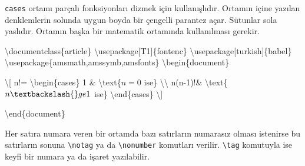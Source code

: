\documentclass[
  letterpaper,
  DIV=11,
  numbers=noendperiod]{scrreprt}
\newenvironment{Shaded}{\begin{snugshade}}{\end{snugshade}}
\newcommand{\BuiltInTok}[1]{\textcolor[rgb]{0.00,0.23,0.31}{#1}}
\newcommand{\ExtensionTok}[1]{\textcolor[rgb]{0.00,0.23,0.31}{#1}}
\newcommand{\KeywordTok}[1]{\textcolor[rgb]{0.00,0.23,0.31}{#1}}
\newcommand{\NormalTok}[1]{\textcolor[rgb]{0.00,0.23,0.31}{#1}}
\newcommand{\SpecialCharTok}[1]{\textcolor[rgb]{0.37,0.37,0.37}{#1}}
\newcommand{\SpecialStringTok}[1]{\textcolor[rgb]{0.13,0.47,0.30}{#1}}
\begin{document}
\texttt{cases} ortamı parçalı fonksiyonları dizmek için kullanışlıdır.
Ortamın içine yazılan denklemlerin solunda uygun boyda bir çengelli
parantez açar. Sütunlar sola yaslıdır. Ortamın başka bir matematik
ortamında kullanılması gerekir.

\begin{Shaded}
\begin{Highlighting}[]
\BuiltInTok{\textbackslash{}documentclass}\NormalTok{\{}\ExtensionTok{article}\NormalTok{\}}
\BuiltInTok{\textbackslash{}usepackage}\NormalTok{[T1]\{}\ExtensionTok{fontenc}\NormalTok{\}}
\BuiltInTok{\textbackslash{}usepackage}\NormalTok{[turkish]\{}\ExtensionTok{babel}\NormalTok{\}}
\BuiltInTok{\textbackslash{}usepackage}\NormalTok{\{}\ExtensionTok{amsmath,amssymb,amsfonts}\NormalTok{\}}
\KeywordTok{\textbackslash{}begin}\NormalTok{\{}\ExtensionTok{document}\NormalTok{\}}

\SpecialStringTok{\textbackslash{}[}
\SpecialStringTok{n!=}
\KeywordTok{\textbackslash{}begin}\NormalTok{\{}\ExtensionTok{cases}\NormalTok{\}}
\SpecialStringTok{1 \& }\SpecialCharTok{\textbackslash{}text}\NormalTok{\{}\SpecialStringTok{$n=0$}\NormalTok{ ise\}}\SpecialStringTok{ }\SpecialCharTok{\textbackslash{}\textbackslash{}}
\SpecialStringTok{n(n{-}1)!\& }\SpecialCharTok{\textbackslash{}text}\NormalTok{\{}\SpecialStringTok{$n\textbackslash{}ge 1$}\NormalTok{ ise\}}
\KeywordTok{\textbackslash{}end}\NormalTok{\{}\ExtensionTok{cases}\NormalTok{\}}
\SpecialStringTok{\textbackslash{}]}

\KeywordTok{\textbackslash{}end}\NormalTok{\{}\ExtensionTok{document}\NormalTok{\}}
\end{Highlighting}
\end{Shaded}

Her satıra numara veren bir ortamda bazı satırların numarasız olması
istenirse bu satırların sonuna \texttt{\textbackslash{}notag} ya da
\texttt{\textbackslash{}nonumber} komutları verilir.
\texttt{\textbackslash{}tag} komutuyla ise keyfi bir numara ya da işaret
yazılabilir.
\end{document}
